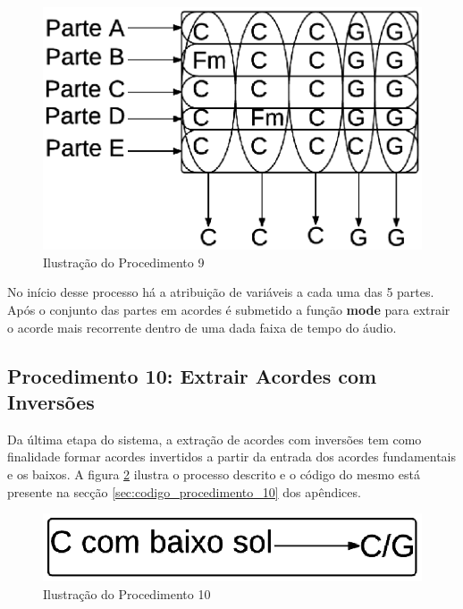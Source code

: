 \begin{figure}[h] 
  \centering
    \includegraphics[keepaspectratio=true, scale=0.55]{figuras/procedimento_9}
    \caption{Ilustração do Procedimento 9}
    \label{fig:procedimento_9}
\end{figure}

No início desse processo há a atribuição de variáveis a cada uma das 5 partes. Após o conjunto das partes em acordes é submetido a função \textbf{mode} para extrair o acorde mais recorrente dentro de uma dada faixa de tempo do áudio.


\subsection{Procedimento 10: Extrair Acordes com Inversões}
\label{subsec:procedimento_10}

Da última etapa do sistema, a extração de acordes com inversões tem como finalidade formar acordes invertidos a partir da entrada dos acordes fundamentais e os baixos. A figura \ref{fig:procedimento_10} ilustra o processo descrito e o código do mesmo está presente na secção \ref{sec:codigo_procedimento_10} dos apêndices.

\begin{figure}[h] 
  \centering
    \includegraphics[keepaspectratio=true, scale=0.55]{figuras/procedimento_10}
    \caption{Ilustração do Procedimento 10}
    \label{fig:procedimento_10}
\end{figure}

